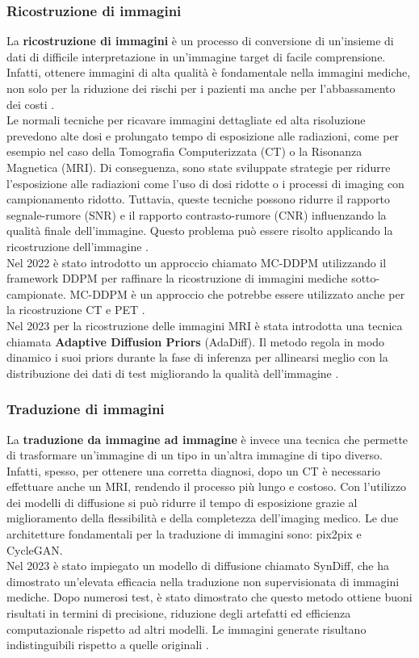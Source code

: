 \subsubsection{Ricostruzione di immagini}
La \textbf{ricostruzione di immagini} è un processo di conversione di un'insieme di dati di difficile interpretazione in un'immagine target di facile comprensione.
Infatti, ottenere immagini di alta qualità è fondamentale nella immagini mediche, non solo per la riduzione dei rischi per i pazienti ma anche per l'abbassamento dei costi \cite{levac2023mri}.\\
Le normali tecniche per ricavare immagini dettagliate ed alta risoluzione prevedono alte dosi e prolungato tempo di esposizione alle radiazioni, come per esempio nel caso della Tomografia Computerizzata (CT) o la Risonanza Magnetica (MRI). Di conseguenza, sono state sviluppate strategie per ridurre l'esposizione alle radiazioni come l'uso di dosi ridotte o i processi di imaging con campionamento ridotto.
Tuttavia, queste tecniche possono ridurre il rapporto segnale-rumore (SNR) e il rapporto contrasto-rumore (CNR) influenzando la qualità finale dell'immagine. Questo problema può essere risolto applicando la ricostruzione dell'immagine \cite{shokrollahi2023comprehensive}.\\
Nel 2022 è stato introdotto un approccio chiamato MC-DDPM utilizzando il framework DDPM per raffinare la ricostruzione di immagini mediche sotto-campionate.
MC-DDPM è un approccio che potrebbe essere utilizzato anche per la ricostruzione CT e PET \cite{xie2022measurement}.\\
Nel 2023 per la ricostruzione delle immagini MRI è stata introdotta una tecnica chiamata \textbf{Adaptive Diffusion Priors} (AdaDiff).
Il metodo regola in modo dinamico i suoi priors durante la fase di inferenza per allinearsi meglio con la distribuzione dei dati di test migliorando la qualità dell'immagine \cite{gungor2023adaptive}.
\subsubsection{Traduzione di immagini}
La \textbf{traduzione da immagine ad immagine} è invece una tecnica che permette di trasformare un'immagine di un tipo in un'altra immagine di tipo diverso. Infatti, spesso, per ottenere una corretta diagnosi, dopo un CT è necessario effettuare anche un MRI, rendendo il processo più lungo e costoso.
Con l'utilizzo dei modelli di diffusione si può ridurre il tempo di esposizione grazie al miglioramento della flessibilità e della completezza dell'imaging medico.
Le due architetture fondamentali per la traduzione di immagini sono: pix2pix\cite{isola2017image} e CycleGAN\cite{chu2017cyclegan}.\\
Nel 2023 è stato impiegato un modello di diffusione chiamato SynDiff, che ha dimostrato un'elevata efficacia nella traduzione non supervisionata di immagini mediche. Dopo numerosi test, è stato dimostrato che questo metodo ottiene buoni risultati in termini di precisione, riduzione degli artefatti ed efficienza computazionale rispetto ad altri modelli. Le immagini generate risultano indistinguibili rispetto a quelle originali \cite{ozbey2023unsupervised}.
